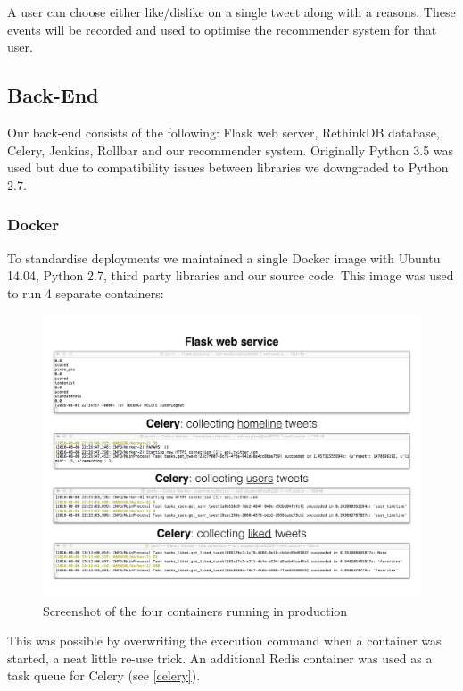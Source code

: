 \documentclass{article}
\begin{document}
A user can choose either like/dislike on a single tweet along with a reasons. These events will be recorded and used to optimise the recommender system for that user.


\newpage



\subsection{Back-End} 

Our back-end consists of the following: Flask web server, RethinkDB database, Celery, Jenkins, Rollbar and our recommender system. Originally Python 3.5 was used but due to compatibility issues between libraries we downgraded to Python 2.7.



\subsubsection*{Docker} 
To standardise deployments we maintained a single Docker image with Ubuntu 14.04, Python 2.7, third party libraries and our source code. This image was used to run 4 separate containers:

\begin{figure}[H]
    \centering
    \includegraphics[width=\textwidth,trim={0 1cm 0 1cm},clip]{4containers}
    \caption{Screenshot of the four containers running in production}
\end{figure}

\noindent This was possible by overwriting the execution command when a container was started, a neat little re-use trick. An additional Redis container was used as a task queue for Celery (see \ref{celery}).
\end{document}
